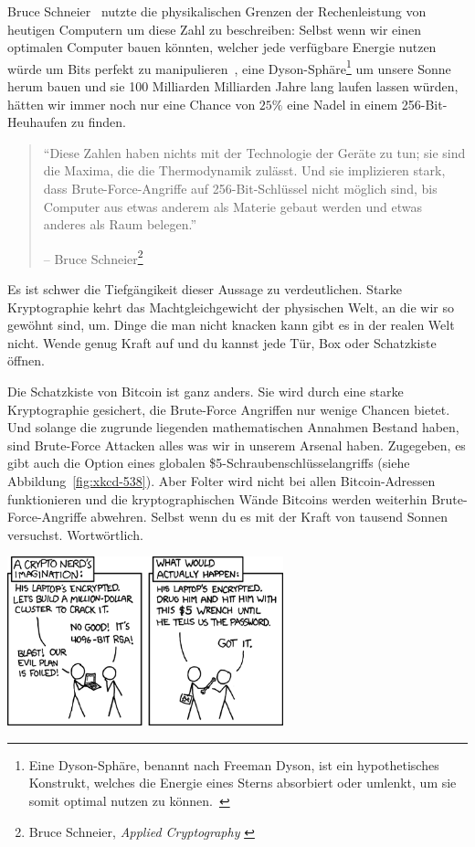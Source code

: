 Bruce Schneier~\cite{web:schneier} nutzte die physikalischen Grenzen der
Rechenleistung von heutigen Computern um diese Zahl zu beschreiben: Selbst wenn
wir einen optimalen Computer bauen könnten, welcher jede verfügbare Energie
nutzen würde um Bits perfekt zu manipulieren~\cite{wiki:landauer}, eine
Dyson-Sphäre\footnote{Eine Dyson-Sphäre, benannt nach Freeman Dyson, ist ein
hypothetisches Konstrukt, welches die Energie eines Sterns absorbiert oder
umlenkt, um sie somit optimal nutzen zu können.~\cite{wiki:dyson}} um unsere
Sonne herum bauen und sie 100 Milliarden Milliarden Jahre lang laufen lassen
würden, hätten wir immer noch nur eine Chance von $25\%$ eine Nadel in einem
256-Bit-Heuhaufen zu finden.

\begin{quotation}\begin{samepage}
\enquote{Diese Zahlen haben nichts mit der Technologie der Geräte zu tun; sie
sind die Maxima, die die Thermodynamik zulässt. Und sie implizieren stark, dass
Brute-Force-Angriffe auf 256-Bit-Schlüssel nicht möglich sind, bis Computer aus
etwas anderem als Materie gebaut werden und etwas anderes als Raum belegen.}
\begin{flushright} -- Bruce Schneier\footnote{Bruce Schneier, \textit{Applied Cryptography} \cite{bruce-schneier}}
\end{flushright}\end{samepage}\end{quotation}

Es ist schwer die Tiefgängikeit dieser Aussage zu verdeutlichen. Starke
Kryptographie kehrt das Machtgleichgewicht der physischen Welt, an die wir so
gewöhnt sind, um. Dinge die man nicht knacken kann gibt es in der realen Welt
nicht. Wende genug Kraft auf und du kannst jede Tür, Box oder Schatzkiste
öffnen.

Die Schatzkiste von Bitcoin ist ganz anders. Sie wird durch eine starke
Kryptographie gesichert, die Brute-Force Angriffen nur wenige Chancen bietet.
Und solange die zugrunde liegenden mathematischen Annahmen Bestand haben, sind
Brute-Force Attacken alles was wir in unserem Arsenal haben. Zugegeben, es gibt
auch die Option eines globalen \$5-Schraubenschlüsselangriffs (siehe
Abbildung~\ref{fig:xkcd-538}). Aber Folter wird nicht bei allen Bitcoin-Adressen
funktionieren und die kryptographischen Wände Bitcoins werden weiterhin
Brute-Force-Angriffe abwehren. Selbst wenn du es mit der Kraft von tausend
Sonnen versuchst. Wortwörtlich.

\begin{center}
  \centering
  \includegraphics[width=8cm]{assets/images/xkcd-538.png}
  \label{fig:xkcd-538}
\end{center}

